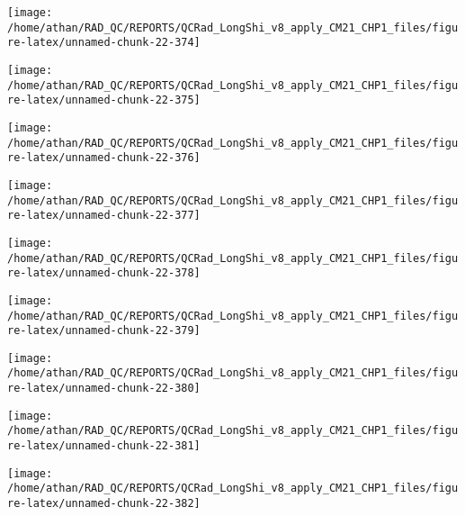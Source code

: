 \documentclass[
  10pt,
  a4paper,oneside]{article}
\begin{document}
\begin{center}\texttt{[image: /home/athan/RAD\_QC/REPORTS/QCRad\_LongShi\_v8\_apply\_CM21\_CHP1\_files/figure-latex/unnamed-chunk-22-374]} \end{center}

\begin{center}\texttt{[image: /home/athan/RAD\_QC/REPORTS/QCRad\_LongShi\_v8\_apply\_CM21\_CHP1\_files/figure-latex/unnamed-chunk-22-375]} \end{center}

\begin{center}\texttt{[image: /home/athan/RAD\_QC/REPORTS/QCRad\_LongShi\_v8\_apply\_CM21\_CHP1\_files/figure-latex/unnamed-chunk-22-376]} \end{center}

\begin{center}\texttt{[image: /home/athan/RAD\_QC/REPORTS/QCRad\_LongShi\_v8\_apply\_CM21\_CHP1\_files/figure-latex/unnamed-chunk-22-377]} \end{center}

\begin{center}\texttt{[image: /home/athan/RAD\_QC/REPORTS/QCRad\_LongShi\_v8\_apply\_CM21\_CHP1\_files/figure-latex/unnamed-chunk-22-378]} \end{center}

\begin{center}\texttt{[image: /home/athan/RAD\_QC/REPORTS/QCRad\_LongShi\_v8\_apply\_CM21\_CHP1\_files/figure-latex/unnamed-chunk-22-379]} \end{center}

\begin{center}\texttt{[image: /home/athan/RAD\_QC/REPORTS/QCRad\_LongShi\_v8\_apply\_CM21\_CHP1\_files/figure-latex/unnamed-chunk-22-380]} \end{center}

\begin{center}\texttt{[image: /home/athan/RAD\_QC/REPORTS/QCRad\_LongShi\_v8\_apply\_CM21\_CHP1\_files/figure-latex/unnamed-chunk-22-381]} \end{center}

\begin{center}\texttt{[image: /home/athan/RAD\_QC/REPORTS/QCRad\_LongShi\_v8\_apply\_CM21\_CHP1\_files/figure-latex/unnamed-chunk-22-382]} \end{center}
\end{document}
